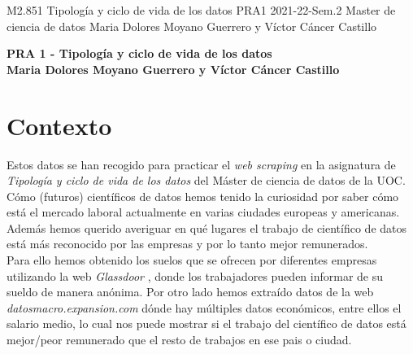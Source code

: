 \documentclass[IB]{PlantillaPACnova_Est}
\begin{document}
\textinicial
{M2.851} 				
{Tipología y ciclo de vida de los datos}
{PRA1}
{2021-22-Sem.2}
{Master de ciencia de datos}
{Maria Dolores Moyano Guerrero y Víctor Cáncer Castillo}




\begin{center}
\textbf{{\LARGE PRA 1 - Tipología y ciclo de vida de los datos}}\\[1cm]

\textbf{{\Large Maria Dolores Moyano Guerrero y Víctor Cáncer Castillo}}
\end{center}

\tableofcontents

\section{Contexto}

Estos datos se han recogido para practicar el \textit{web scraping} en la asignatura de \textit{Tipología y ciclo de vida de los datos} del Máster de ciencia de datos de la UOC.\\

Cómo (futuros) científicos de datos hemos tenido la curiosidad por saber cómo está el mercado laboral actualmente en varias ciudades europeas y americanas. Además hemos querido averiguar en qué lugares el trabajo de científico de datos está más reconocido por las empresas y por lo tanto mejor remunerados. \\
Para ello hemos obtenido los suelos que se ofrecen por diferentes empresas utilizando la web \textit{Glassdoor} \cite{glassdoor}, donde los trabajadores pueden informar de su sueldo de manera anónima. Por otro lado hemos extraído datos de la web \textit{datosmacro.expansion.com} \cite{datosmacro} dónde hay múltiples datos económicos, entre ellos el salario medio, lo cual nos puede mostrar si el trabajo del científico de datos está mejor/peor remunerado que el resto de trabajos en ese pais o ciudad. 
\end{document}
